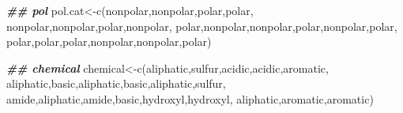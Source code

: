 \documentclass[
]{book}
\newenvironment{Shaded}{\begin{snugshade}}{\end{snugshade}}
\newcommand{\DocumentationTok}[1]{\textcolor[rgb]{0.56,0.35,0.01}{\textbf{\textit{#1}}}}
\newcommand{\FunctionTok}[1]{\textcolor[rgb]{0.00,0.00,0.00}{#1}}
\newcommand{\NormalTok}[1]{#1}
\newcommand{\OtherTok}[1]{\textcolor[rgb]{0.56,0.35,0.01}{#1}}
\newcommand{\StringTok}[1]{\textcolor[rgb]{0.31,0.60,0.02}{#1}}
\begin{document}
\begin{Shaded}
\begin{Highlighting}[]
\DocumentationTok{\#\# pol}
\NormalTok{pol.cat}\OtherTok{\textless{}{-}}\FunctionTok{c}\NormalTok{(}\StringTok{\textquotesingle{}nonpolar\textquotesingle{}}\NormalTok{,}\StringTok{\textquotesingle{}nonpolar\textquotesingle{}}\NormalTok{,}\StringTok{\textquotesingle{}polar\textquotesingle{}}\NormalTok{,}\StringTok{\textquotesingle{}polar\textquotesingle{}}\NormalTok{,}
                \StringTok{\textquotesingle{}nonpolar\textquotesingle{}}\NormalTok{,}\StringTok{\textquotesingle{}nonpolar\textquotesingle{}}\NormalTok{,}\StringTok{\textquotesingle{}polar\textquotesingle{}}\NormalTok{,}\StringTok{\textquotesingle{}nonpolar\textquotesingle{}}\NormalTok{,}
                \StringTok{\textquotesingle{}polar\textquotesingle{}}\NormalTok{,}\StringTok{\textquotesingle{}nonpolar\textquotesingle{}}\NormalTok{,}\StringTok{\textquotesingle{}nonpolar\textquotesingle{}}\NormalTok{,}\StringTok{\textquotesingle{}polar\textquotesingle{}}\NormalTok{,}\StringTok{\textquotesingle{}nonpolar\textquotesingle{}}\NormalTok{,}\StringTok{\textquotesingle{}polar\textquotesingle{}}\NormalTok{,}
                \StringTok{\textquotesingle{}polar\textquotesingle{}}\NormalTok{,}\StringTok{\textquotesingle{}polar\textquotesingle{}}\NormalTok{,}\StringTok{\textquotesingle{}polar\textquotesingle{}}\NormalTok{,}\StringTok{\textquotesingle{}nonpolar\textquotesingle{}}\NormalTok{,}\StringTok{\textquotesingle{}nonpolar\textquotesingle{}}\NormalTok{,}\StringTok{\textquotesingle{}polar\textquotesingle{}}\NormalTok{)}

\DocumentationTok{\#\# chemical}
\NormalTok{chemical}\OtherTok{\textless{}{-}}\FunctionTok{c}\NormalTok{(}\StringTok{\textquotesingle{}aliphatic\textquotesingle{}}\NormalTok{,}\StringTok{\textquotesingle{}sulfur\textquotesingle{}}\NormalTok{,}\StringTok{\textquotesingle{}acidic\textquotesingle{}}\NormalTok{,}\StringTok{\textquotesingle{}acidic\textquotesingle{}}\NormalTok{,}\StringTok{\textquotesingle{}aromatic\textquotesingle{}}\NormalTok{,}
            \StringTok{\textquotesingle{}aliphatic\textquotesingle{}}\NormalTok{,}\StringTok{\textquotesingle{}basic\textquotesingle{}}\NormalTok{,}\StringTok{\textquotesingle{}aliphatic\textquotesingle{}}\NormalTok{,}\StringTok{\textquotesingle{}basic\textquotesingle{}}\NormalTok{,}\StringTok{\textquotesingle{}aliphatic\textquotesingle{}}\NormalTok{,}\StringTok{\textquotesingle{}sulfur\textquotesingle{}}\NormalTok{,}
            \StringTok{\textquotesingle{}amide\textquotesingle{}}\NormalTok{,}\StringTok{\textquotesingle{}aliphatic\textquotesingle{}}\NormalTok{,}\StringTok{\textquotesingle{}amide\textquotesingle{}}\NormalTok{,}\StringTok{\textquotesingle{}basic\textquotesingle{}}\NormalTok{,}\StringTok{\textquotesingle{}hydroxyl\textquotesingle{}}\NormalTok{,}\StringTok{\textquotesingle{}hydroxyl\textquotesingle{}}\NormalTok{,}
            \StringTok{\textquotesingle{}aliphatic\textquotesingle{}}\NormalTok{,}\StringTok{\textquotesingle{}aromatic\textquotesingle{}}\NormalTok{,}\StringTok{\textquotesingle{}aromatic\textquotesingle{}}\NormalTok{)}
\end{Highlighting}
\end{Shaded}
\end{document}
